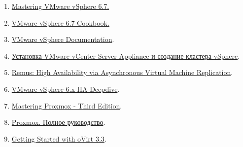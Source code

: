 \documentclass[14pt, a4paper]{article}
\begin{document}
\begin{enumerate}
    \item \href{https://www.amazon.com/Mastering-VMware-vSphere-Nick-Marshall/dp/1119512948}{Mastering VMware vSphere 6.7.}
    \item \href{https://www.amazon.com/VMware-vSphere-6-7-Cookbook-orchestrate/dp/1789953006}{VMware vSphere 6.7 Cookbook.}
    \item \href{https://docs.vmware.com/en/VMware-vSphere/index.html}{VMware vSphere Documentation}.
    \item \href{https://medium.com/@alexander.bazhenov/установка-vmware-vcenter-server-appliance-5beb779ff2c3}{Установка VMware vCenter Server Appliance и создание кластера vSphere}.
    \item \href{https://www.usenix.org/legacy/event/nsdi08/tech/full_papers/cully/cully_html/index.html}{Remus: High Availability via Asynchronous Virtual Machine Replication}.
    \item \href{https://www.vmgu.ru/ext/books/vsphere-ha-deepdive.pdf}{VMware vSphere 6.x HA Deepdive}.
    \item \href{https://www.packtpub.com/product/mastering-proxmox-second-edition/9781785888243}{Mastering Proxmox - Third Edition}.
    \item \href{http://onreader.mdl.ru/MasteringProxmox.3ed/content/index.html}{Proxmox. Полное руководство}.
    \item \href{https://subscription.packtpub.com/search?query=getting%20started%20ovirt%2033}{Getting Started with oVirt 3.3}.
\end{enumerate}
\end{document}
